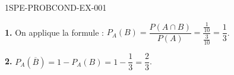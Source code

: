 \begin{corrige}{1SPE-PROBCOND-EX-001}

\textbf{1.} On applique la formule : $P_A(B) = \dfrac{P(A \cap B)}{P(A)} = \dfrac{\frac{1}{10}}{\frac{3}{10}} = \dfrac{1}{3}$.

\medskip
\textbf{2.} $P_A(\overline{B}) = 1 - P_A(B) = 1 - \dfrac{1}{3} = \dfrac{2}{3}$.

\end{corrige}
